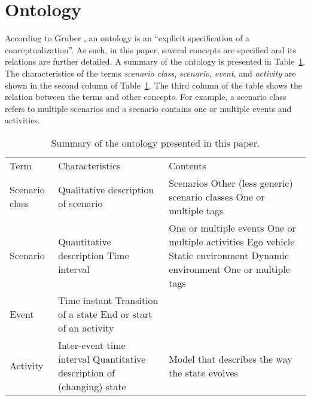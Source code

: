 \section{Ontology}
\label{sec:ontology}

According to Gruber \cite{gruber1993ontology}, an ontology is an ``explicit specification of a conceptualization''. As such, in this paper, several concepts are specified and its relations are further detailed. A summary of the ontology is presented in Table~\ref{tab:ontology}. The characteristics of the terms \emph{scenario class}, \emph{scenario}, \emph{event}, and \emph{activity} are shown in the second column of Table~\ref{tab:ontology}. The third column of the table shows the relation between the terms and other concepts. For example, a scenario class refers to multiple scenarios and a scenario contains one or multiple events and activities.

\begin{table}
	\centering
	\caption{Summary of the ontology presented in this paper.}
	\label{tab:ontology}
	\begin{tabularx}{\linewidth}{p{3em} X X}
		\toprule
		Term & Characteristics & Contents \\ \otoprule
		Scenario class & Qualitative description of scenario & Scenarios \newline Other (less generic) scenario classes \newline One or multiple tags \\
		Scenario & Quantitative description \newline Time interval & One or multiple events \newline One or multiple activities \newline Ego vehicle \newline Static environment \newline Dynamic environment \newline One or multiple tags \\
		Event & Time instant \newline Transition of a state \newline End or start of an activity & \\
		Activity & Inter-event time interval \newline Quantitative description of (changing) state & Model that describes the way the state evolves \\
		\bottomrule
	\end{tabularx}
\end{table}

